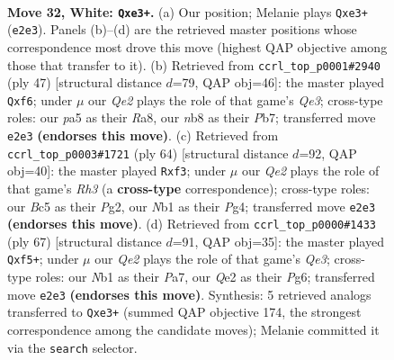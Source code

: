 \documentclass[11pt]{article}
\begin{document}
\clearpage

\begin{figure}[p]\centering
\begin{subfigure}{0.46\textwidth}\centering
\resizebox{\linewidth}{!}{%
\newchessgame
\chessboard[
  setfen={rnb1k3/8/5R2/p1Bp2q1/1p6/4r3/PPP1Q1P1/RN4K1 w - - 10 32},
  showmover=false,
  pgfstyle=straightmove, color=movearrow, markmove={e2-e3}
]}
\caption{}
\end{subfigure}\hfill
\begin{subfigure}{0.46\textwidth}\centering
\resizebox{\linewidth}{!}{%
\newchessgame
\chessboard[
  setfen={r5k1/1p4pp/p2pqR2/P3n3/4P3/4B3/1P4PP/R2Q3K b - - 0 24},
  showmover=false,
  pgfstyle=straightmove, color=movearrow, markmove={e6-f6}
]}
\caption{}
\end{subfigure}
\\[4pt]
\begin{subfigure}{0.46\textwidth}\centering
\resizebox{\linewidth}{!}{%
\newchessgame
\chessboard[
  setfen={2r4k/6p1/p6p/2qBQ1b1/6P1/5r1R/P1P3P1/7K w - - 0 33},
  showmover=false,
  pgfstyle=straightmove, color=movearrow, markmove={h3-f3}
]}
\caption{}
\end{subfigure}\hfill
\begin{subfigure}{0.46\textwidth}\centering
\resizebox{\linewidth}{!}{%
\newchessgame
\chessboard[
  setfen={8/p5k1/Pp2q1p1/5RQn/2Bp4/8/1P3KPP/4r3 b - - 4 34},
  showmover=false,
  pgfstyle=straightmove, color=movearrow, markmove={e6-f5}
]}
\caption{}
\end{subfigure}
\caption{\textbf{Move 32, White: \texttt{Qxe3+}.} (a) Our position; Melanie plays \texttt{Qxe3+} (\texttt{e2e3}). Panels (b)--(d) are the retrieved master positions whose correspondence most drove this move (highest QAP objective among those that transfer to it). (b) Retrieved from \texttt{ccrl\_top\_p0001\#2940} (ply 47) [structural distance $d$=79, QAP obj=46]: the master played \texttt{Qxf6}; under $\mu$ our \emph{Qe2} plays the role of that game's \emph{Qe3}; cross-type roles: our \emph{p}a5 as their \emph{R}a8, our \emph{n}b8 as their \emph{P}b7; transferred move \texttt{e2e3} \textbf{(endorses this move)}. (c) Retrieved from \texttt{ccrl\_top\_p0003\#1721} (ply 64) [structural distance $d$=92, QAP obj=40]: the master played \texttt{Rxf3}; under $\mu$ our \emph{Qe2} plays the role of that game's \emph{Rh3} (a \textbf{cross-type} correspondence); cross-type roles: our \emph{B}c5 as their \emph{P}g2, our \emph{N}b1 as their \emph{P}g4; transferred move \texttt{e2e3} \textbf{(endorses this move)}. (d) Retrieved from \texttt{ccrl\_top\_p0000\#1433} (ply 67) [structural distance $d$=91, QAP obj=35]: the master played \texttt{Qxf5+}; under $\mu$ our \emph{Qe2} plays the role of that game's \emph{Qe3}; cross-type roles: our \emph{N}b1 as their \emph{P}a7, our \emph{Q}e2 as their \emph{P}g6; transferred move \texttt{e2e3} \textbf{(endorses this move)}. Synthesis: 5 retrieved analogs transferred to \texttt{Qxe3+} (summed QAP objective 174, the strongest correspondence among the candidate moves); Melanie committed it via the \texttt{search} selector.}
\label{fig:thought-m62}
\end{figure}
\end{document}
